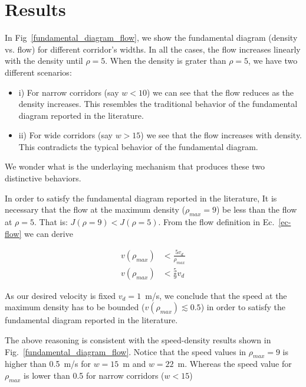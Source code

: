 \section{\label{results}Results}

In Fig~\ref{fundamental_diagram_flow}, we show the fundamental diagram (density vs. flow) for different corridor's widths. In all the cases, the flow increases linearly with the density until $\rho=5$. When the density is grater than $\rho = 5$, we have two different scenarios:




\begin{itemize}
\item i) For narrow corridors (say $w < 10$) we can see that the flow reduces as the density increases. This resembles the traditional behavior of the fundamental diagram reported in the literature. 
\item ii) For wide corridors (say $w > 15$) we see that the flow increases with density. This contradicts the typical behavior of the fundamental diagram.   
\end{itemize}

We wonder what is the underlaying mechanism that produces these two distinctive behaviors. 

In order to satisfy the fundamental diagram reported in the literature, It is necessary that the flow at the maximum density ($\rho_{max} = 9$) be less than the flow at $\rho = 5$. That is:  $J(\rho = 9) < J(\rho = 5)$. From the flow definition in Ec.~\ref{ec-flow} we can derive

\begin{align*} 
v(\rho_{max}) &< \frac{5v_d}{\rho_{max}} \\
v(\rho_{max}) &< \frac{5}{9} v_d
\end{align*}



As our desired velocity is fixed $v_d = 1$~m/s, we conclude that the speed at the maximum density has to be bounded ($v(\rho_{max}) \lesssim 	0.5$) in order to satisfy the fundamental diagram reported in the literature.   

The above reasoning is consistent with the speed-density results shown in Fig.~\ref{fundamental_diagram_flow}. Notice that the speed values in $\rho_{max} = 9$ is higher than 0.5~m/s for $w=15$~m and $w=22$~m. Whereas the speed value for $\rho_{max}$ is lower than 0.5 for narrow corridors ($w<15$)

